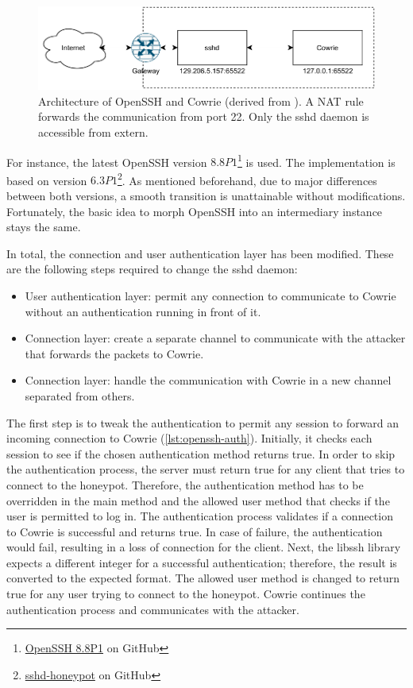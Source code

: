 \begin{figure}
    \centering
    \includegraphics{figures/sshd-honeypot.pdf}
    \caption[Architecture of OpenSSH and Cowrie]{
        Architecture of OpenSSH and Cowrie (derived from \cite{vetterl2020}).
        A NAT rule forwards the communication from port 22.
        Only the sshd daemon is accessible from extern.
    }
    \label{fig:cowrie-fix}
\end{figure}

For instance, the latest OpenSSH version $8.8P1$\footnote{\href{https://github.com/openssh/openssh-portable/commit/bf944e3794eff5413f2df1ef37cddf96918c6bde}{OpenSSH 8.8P1} on GitHub} is used.
The implementation is based on \citet{vetterl2020} version $6.3P1$\footnote{\href{https://github.com/amv42/sshd-honeypot/commit/f58830161002baec9d3ed218e78ddb06b0d40a23}{sshd-honeypot} on GitHub}.
As mentioned beforehand, due to major differences between both versions, a smooth transition is unattainable without modifications.
Fortunately, the basic idea to morph OpenSSH into an intermediary instance stays the same.

In total, the connection and user authentication layer has been modified.
These are the following steps required to change the sshd daemon:

\begin{itemize}
    \item User authentication layer: permit any connection to communicate to Cowrie without an authentication running in front of it.
    \item Connection layer: create a separate channel to communicate with the attacker that forwards the packets to Cowrie.
    \item Connection layer: handle the communication with Cowrie in a new channel separated from others.
\end{itemize}

The first step is to tweak the authentication to permit any session to forward an incoming connection to Cowrie (\autoref{lst:openssh-auth}).
Initially, it checks each session to see if the chosen authentication method returns true.
In order to skip the authentication process, the server must return true for any client that tries to connect to the honeypot.
Therefore, the authentication method has to be overridden in the main method and the allowed user method that checks if the user is permitted to log in.
The authentication process validates if a connection to Cowrie is successful and returns true.
In case of failure, the authentication would fail, resulting in a loss of connection for the client.
Next, the libssh library expects a different integer for a successful authentication; therefore, the result is converted to the expected format.
The allowed user method is changed to return true for any user trying to connect to the honeypot.
Cowrie continues the authentication process and communicates with the attacker.

